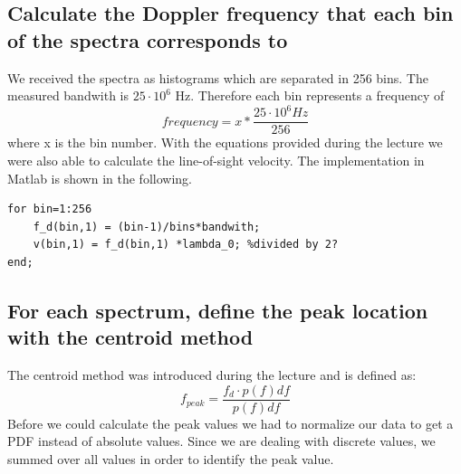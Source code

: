 \documentclass[10pt]{article}
\begin{document}
\subsection{Calculate the Doppler frequency that each bin of the spectra corresponds to}
We received the spectra as histograms which are separated in 256 bins. The measured bandwith is $25\cdot10^6 $ Hz. Therefore each bin represents a frequency of
\begin{equation*}
 frequency = x * \frac{25\cdot10^6 Hz}{256}
\end{equation*}
where x is the bin number.
With the equations provided during the lecture we were also able to calculate the line-of-sight velocity.
The implementation in Matlab is shown in the following.\\

\begin{lstlisting}
for bin=1:256
    f_d(bin,1) = (bin-1)/bins*bandwith;
    v(bin,1) = f_d(bin,1) *lambda_0; %divided by 2?
end;
\end{lstlisting}

\subsection{For each spectrum, define the peak location with the centroid
method}
The centroid method was introduced during the lecture and is defined as:
\begin{equation}
f_{peak} = \frac{f_d \cdot p(f) df}{p(f) df}
\end{equation}
Before we could calculate the peak values we had to normalize our data to get a PDF instead of absolute values.
Since we are dealing with discrete values, we summed over all values in order to identify the peak value.
\end{document}
